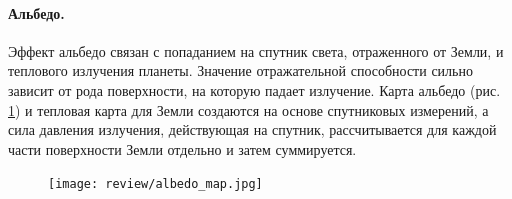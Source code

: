 \paragraph{Альбедо.}
Эффект альбедо связан с попаданием на спутник света, отраженного от Земли, и теплового излучения планеты.
Значение отражательной способности сильно зависит от рода поверхности, на которую падает излучение.
Карта альбедо (рис. \ref{fig:albedo_map}) и тепловая карта для Земли создаются на основе спутниковых измерений, а сила давления излучения,
действующая на спутник, рассчитывается для каждой части поверхности Земли отдельно и затем суммируется.

\begin{figure}[h!]
    \centering
    \texttt{[image: review/albedo\_map.jpg]}
    \label{fig:albedo_map}
\end{figure}